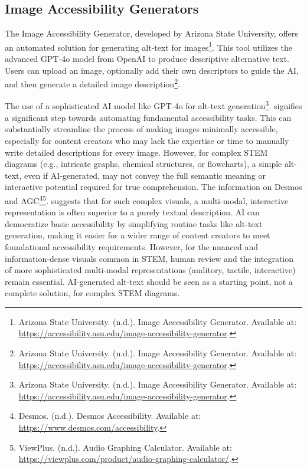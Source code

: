 \subsection{Image Accessibility Generators}

The Image Accessibility Generator, developed by Arizona State University, offers an automated solution for generating alt-text for images\footnote{Arizona State University. (n.d.). Image Accessibility Generator. Available at: \url{https://accessibility.asu.edu/image-accessibility-generator}.}. This tool utilizes the advanced GPT-4o model from OpenAI to produce descriptive alternative text. Users can upload an image, optionally add their own descriptors to guide the AI, and then generate a detailed image description\footnote{Arizona State University. (n.d.). Image Accessibility Generator. Available at: \url{https://accessibility.asu.edu/image-accessibility-generator}.}.

The use of a sophisticated AI model like GPT-4o for alt-text generation\footnote{Arizona State University. (n.d.). Image Accessibility Generator. Available at: \url{https://accessibility.asu.edu/image-accessibility-generator}.}. signifies a significant step towards automating fundamental accessibility tasks. This can substantially streamline the process of making images minimally accessible, especially for content creators who may lack the expertise or time to manually write detailed descriptions for every image. However, for complex STEM diagrams (e.g., intricate graphs, chemical structures, or flowcharts), a simple alt-text, even if AI-generated, may not convey the full semantic meaning or interactive potential required for true comprehension. The information on Desmos and AGC\footnote{Desmos. (n.d.). Desmos Accessibility. Available at: \url{https://www.desmos.com/accessibility}.}\footnote{ViewPlus. (n.d.). Audio Graphing Calculator. Available at: \url{https://viewplus.com/product/audio-graphing-calculator/}.}. suggests that for such complex visuals, a multi-modal, interactive representation is often superior to a purely textual description. AI can democratize basic accessibility by simplifying routine tasks like alt-text generation, making it easier for a wider range of content creators to meet foundational accessibility requirements. However, for the nuanced and information-dense visuals common in STEM, human review and the integration of more sophisticated multi-modal representations (auditory, tactile, interactive) remain essential. AI-generated alt-text should be seen as a starting point, not a complete solution, for complex STEM diagrams.

